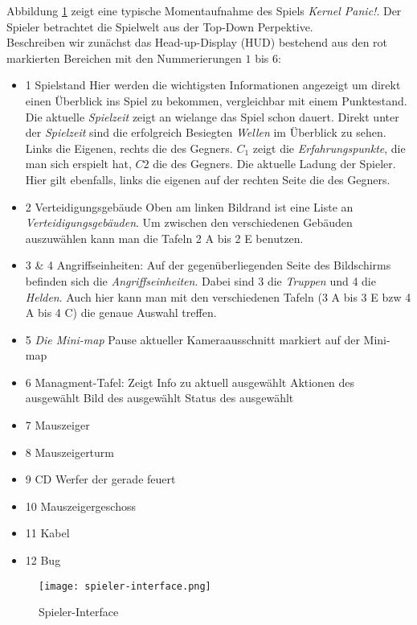 Abbildung \ref{fig:spieler-interface} zeigt eine typische Momentaufnahme des Spiels \textit{Kernel Panic!}.
Der Spieler betrachtet die Spielwelt aus der Top-Down Perpektive.\\
Beschreiben wir zunächst das Head-up-Display (HUD) bestehend aus den rot markierten Bereichen mit den Nummerierungen $1$ bis $6$:
\begin{itemize}
	\item{1 Spielstand} Hier werden die wichtigsten Informationen angezeigt um direkt einen Überblick ins Spiel zu bekommen, vergleichbar mit einem Punktestand.
		 Die aktuelle \textit{Spielzeit} zeigt an wielange das Spiel schon dauert.
		 Direkt unter der \textit{Spielzeit} sind die erfolgreich Besiegten \textit{Wellen} im Überblick zu sehen. Links die Eigenen, rechts die des Gegners.
		 $C_{1}$ zeigt die \textit{Erfahrungspunkte}, die man sich erspielt hat, $C{2}$ die des Gegners.
		 Die aktuelle Ladung der Spieler. Hier gilt ebenfalls, links die eigenen auf der rechten Seite die des Gegners.
	\item {2 Verteidigungsgebäude} Oben am linken Bildrand ist eine Liste an \textit{Verteidigungsgebäuden}. Um zwischen den verschiedenen Gebäuden auszuwählen kann man die Tafeln 2 A bis 2 E benutzen.
	\item {3 \& 4 Angriffseinheiten:} Auf der gegenüberliegenden Seite des Bildschirms befinden sich die \textit{Angriffseinheiten}. Dabei sind 3 die \textit{Truppen }und 4 die \textit{Helden}. Auch hier kann man mit den verschiedenen Tafeln (3 A bis 3 E bzw 4 A bis 4 C) die genaue Auswahl treffen.
	\item {5 }
		 \textit{Die Mini-map}
		 Pause
		 aktueller Kameraausschnitt markiert auf der Mini-map
	\item {6 Managment-Tafel:} Zeigt Info zu aktuell ausgewählt 
		 Aktionen des ausgewählt
		 Bild des ausgewählt
		 Status des ausgewählt
	\item {7 Mauszeiger} 
	\item {8 Mauszeigerturm}
	\item {9 CD Werfer der gerade feuert}
	\item {10 Mauszeigergeschoss}
	\item {11 Kabel}
	\item {12 Bug}
\end{itemize}
\begin{figure}[ht]
	\centering
	\texttt{[image: spieler-interface.png]}
	\caption{Spieler-Interface}
	\label{fig:spieler-interface}
\end{figure}
